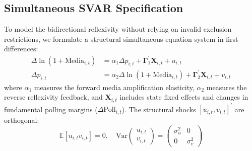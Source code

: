 \documentclass[12pt, a4paper]{article}
\begin{document}
\subsection{Simultaneous SVAR Specification}
To model the bidirectional reflexivity without relying on invalid exclusion restrictions, we formulate a structural simultaneous equation system in first-differences:
\begin{align}
\Delta \ln(1 + \text{Media}_{i,t}) &= \alpha_1 \Delta p_{i,t} + \mathbf{\Gamma}_1^\prime \mathbf{X}_{i,t} + u_{i,t} \label{eq:svar_media} \\
\Delta p_{i,t} &= \alpha_2 \Delta \ln(1 + \text{Media}_{i,t}) + \mathbf{\Gamma}_2^\prime \mathbf{X}_{i,t} + v_{i,t} \label{eq:svar_price}
\end{align}
where $\alpha_1$ measures the forward media amplification elasticity, $\alpha_2$ measures the reverse reflexivity feedback, and $\mathbf{X}_{i,t}$ includes state fixed effects and changes in fundamental polling margins ($\Delta \text{Poll}_{i,t}$). The structural shocks $[u_{i,t}, v_{i,t}]^\prime$ are orthogonal:
\begin{equation}
\mathbb{E}[u_{i,t} v_{i,t}] = 0, \quad \text{Var}\begin{pmatrix} u_{i,t} \\ v_{i,t} \end{pmatrix} = \begin{pmatrix} \sigma_u^2 & 0 \\ 0 & \sigma_v^2 \end{pmatrix}
\end{equation}
\end{document}
